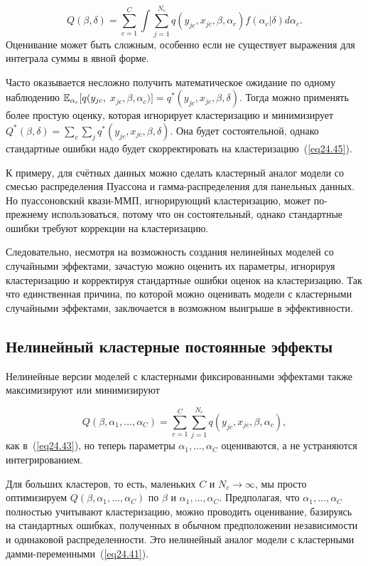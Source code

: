 $$
Q(\beta, \delta) = \sum_{c=1}^C \int \sum_{j=1}^{N_c} q(y_{jc}, x_{jc}, \beta, \alpha_c) f(\alpha_c|\delta) d \alpha_c.
$$
Оценивание может быть сложным, особенно если не существует выражения для интеграла суммы в явной форме. 

Часто оказывается несложно получить математическое ожидание по одному наблюдению $\mathbb{E}_{\alpha_c} [q(y_{jc},$ $x_{jc}, \beta, \alpha_c)] = q^* (y_{jc}, x_{jc}, \beta, \delta)$. Тогда можно применять более простую оценку, которая игнорирует кластеризацию и минимизирует $Q^*(\beta, \delta) = \sum_c \sum_j q^* (y_{jc}, x_{jc}, \beta, \delta)$. Она будет состоятельной, однако стандартные ошибки надо будет скорректировать на кластеризацию~(\ref{eq24.45}). 

К примеру, для счётных данных можно сделать кластерный аналог модели со смесью распределения Пуассона и гамма-распределения для панельных данных. Но пуассоновский квази-ММП, игнорирующий кластеризацию, может по-прежнему использоваться, потому что он состоятельный, однако стандартные ошибки требуют коррекции на кластеризацию. 

Следовательно, несмотря на возможность создания нелинейных моделей со случайными эффектами, зачастую можно оценить их параметры, игнорируя кластеризацию и корректируя стандартные ошибки оценок на кластеризацию. Так что единственная причина, по которой можно оценивать модели с кластерными случайными эффектами, заключается в возможном выигрыше в эффективности. 

\subsection*{Нелинейный кластерные постоянные эффекты}

Нелинейные версии моделей с кластерными фиксированными эффектами также максимизируют или минимизируют 

$$
Q(\beta, \alpha_1, \dots, \alpha_C) = \sum_{c=1}^C \sum_{j=1}^{N_c} q(y_{jc}, x_{jc}, \beta, \alpha_c),
$$
как в~(\ref{eq24.43}), но теперь параметры $\alpha_1, \dots, \alpha_C$ оцениваются, а не устраняются интегрированием. 

Для больших кластеров, то есть, маленьких $C$ и $N_c \to \infty$, мы просто оптимизируем $Q(\beta, \alpha_1, \dots, \alpha_C)$ по $\beta$ и $\alpha_1, \dots, \alpha_C$. Предполагая, что $\alpha_1, \dots, \alpha_C$ полностью учитывают кластеризацию, можно проводить оценивание, базируясь на стандартных ошибках, полученных в обычном предположении независимости и одинаковой распределенности. Это нелинейный аналог модели с кластерными дамми-переменными~(\ref{eq24.41}).

